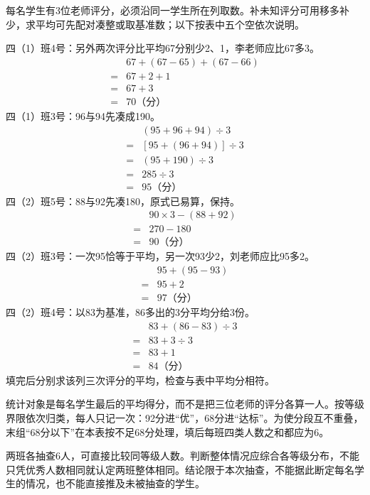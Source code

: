 \documentclass[multi=snippet,border=0pt]{standalone}
\newenvironment{snippet}[3]{\begin{minipage}{#1bp}\color{answerred}\fontsize{#2}{#3}\selectfont\raggedright}{\end{minipage}}
\begin{document}
\begin{snippet}{505}{11.5}{14}每名学生有3位老师评分，必须沿同一学生所在列取数。补未知评分可用移多补少，求平均可先配对凑整或取基准数；以下按表中五个空依次说明。\par 四（1）班4号：另外两次评分比平均67分别少2、1，李老师应比67多3。\[\begin{aligned}&67+(67-65)+(67-66)\\={}&67+2+1\\={}&67+3\\={}&70\text{（分）}\end{aligned}\]四（1）班3号：96与94先凑成190。\[\begin{aligned}&(95+96+94)\div3\\={}&[95+(96+94)]\div3\\={}&(95+190)\div3\\={}&285\div3\\={}&95\text{（分）}\end{aligned}\]四（2）班5号：88与92先凑180，原式已易算，保持。\[\begin{aligned}&90\times3-(88+92)\\={}&270-180\\={}&90\text{（分）}\end{aligned}\]四（2）班3号：一次95恰等于平均，另一次93少2，刘老师应比95多2。\[\begin{aligned}&95+(95-93)\\={}&95+2\\={}&97\text{（分）}\end{aligned}\]四（2）班4号：以83为基准，86多出的3分平均分给3份。\[\begin{aligned}&83+(86-83)\div3\\={}&83+3\div3\\={}&83+1\\={}&84\text{（分）}\end{aligned}\]填完后分别求该列三次评分的平均，检查与表中平均分相符。\end{snippet}
\begin{snippet}{505}{11.5}{14}统计对象是每名学生最后的平均得分，而不是把三位老师的评分各算一人。按等级界限依次归类，每人只记一次：92分进“优”，68分进“达标”。为使分段互不重叠，末组“68分以下”在本表按不足68分处理，填后每班四类人数之和都应为6。\end{snippet}
\begin{snippet}{505}{11.5}{14}两班各抽查6人，可直接比较同等级人数。判断整体情况应综合各等级分布，不能只凭优秀人数相同就认定两班整体相同。结论限于本次抽查，不能据此断定每名学生的情况，也不能直接推及未被抽查的学生。\end{snippet}
\end{document}
